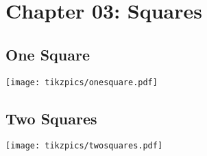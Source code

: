 \documentclass[../main.tex]{subfiles}
\begin{document}
\section{Chapter 03: Squares}

\subsection{One Square}

\texttt{[image: tikzpics/onesquare.pdf]}

\subsection{Two Squares}

\texttt{[image: tikzpics/twosquares.pdf]}
\end{document}
